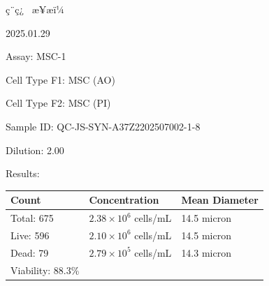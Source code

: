 \documentclass[UTF8,10pt,a4paper,fontset=fandol]{ctexart}
\newcommand{\fieldvalue}[1]{#1}
\newcommand{\handwritten}[1]{#1}
\begin{document}
\begin{center}
\begin{center}
\fieldvalue{\handwritten{ç¨ç¿ }}
\hfill
æ¥æï¼

\fieldvalue{\handwritten{2025.01.29}}

\newpage

\noindent
Assay:
\fieldvalue{MSC-1}

\medskip
\noindent
Cell Type F1:
\fieldvalue{MSC (AO)}

\noindent
Cell Type F2:
\fieldvalue{MSC (PI)}

\medskip
\noindent
Sample ID:
\fieldvalue{QC-JS-SYN-A37Z2202507002-1-8}

\noindent
Dilution:
\fieldvalue{2.00}

\medskip
\noindent
\hrulefill

\noindent
Results:

\medskip
\begin{tabularx}{\textwidth}{@{}>{\raggedright\arraybackslash}X
>{\raggedright\arraybackslash}X
>{\raggedright\arraybackslash}X@{}}
Count & Concentration & Mean Diameter \\
\hline
Total: \fieldvalue{675}
&
\fieldvalue{$2.38\times10^{6}$ cells/mL}
&
\fieldvalue{14.5 micron}
\\
Live: \fieldvalue{596}
&
\fieldvalue{$2.10\times10^{6}$ cells/mL}
&
\fieldvalue{14.5 micron}
\\
Dead: \fieldvalue{79}
&
\fieldvalue{$2.79\times10^{5}$ cells/mL}
&
\fieldvalue{14.3 micron}
\\
Viability: \fieldvalue{88.3\%}
&
&
\end{tabularx}


\end{center}
\end{center}
\end{document}
